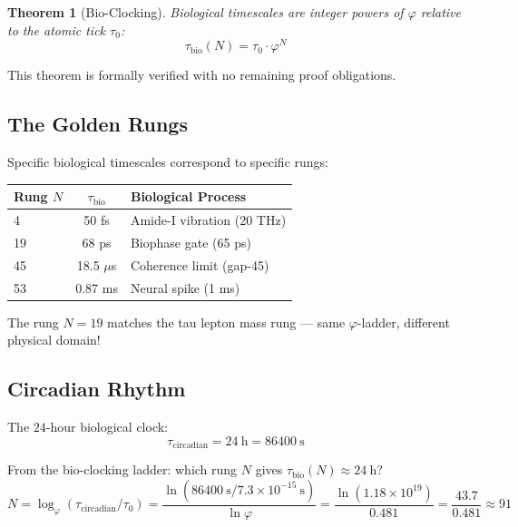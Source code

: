 \documentclass[12pt,a4paper]{article}
\newtheorem{theorem}{Theorem}[section]
\theoremstyle{definition}
\theoremstyle{remark}
\begin{document}
\begin{theorem}[Bio-Clocking]
\label{thm:bioclocking}
Biological timescales are integer powers of $\varphi$ 
relative to the atomic tick $\tau_0$:
\begin{equation}
\tau_\mathrm{bio}(N) = \tau_0 \cdot \varphi^N
\end{equation}
\end{theorem}

This theorem is formally verified with no remaining proof obligations.

\subsection{The Golden Rungs}

Specific biological timescales correspond to specific rungs:

\begin{center}
\begin{tabular}{lcl}
\hline
Rung $N$ & $\tau_\mathrm{bio}$ & Biological Process \\
\hline
4 & 50 fs & Amide-I vibration (20 THz) \\
19 & 68 ps & Biophase gate (65 ps) \\
45 & 18.5 $\mu$s & Coherence limit (gap-45) \\
53 & 0.87 ms & Neural spike (1 ms) \\
\hline
\end{tabular}
\end{center}

The rung $N = 19$ matches the tau lepton mass rung — same $\varphi$-ladder, different physical domain!

\subsection{Circadian Rhythm}

The $24$-hour biological clock:
\begin{equation}
\tau_\mathrm{circadian} = 24~\mathrm{h} = 86400~\mathrm{s}
\end{equation}

From the bio-clocking ladder: which rung $N$ gives $\tau_\mathrm{bio}(N) \approx 24~\mathrm{h}$?
\begin{equation}
N = \log_\varphi(\tau_\mathrm{circadian}/\tau_0) = \frac{\ln(86400~\mathrm{s} / 7.3 \times 10^{-15}~\mathrm{s})}{\ln\varphi}
= \frac{\ln(1.18 \times 10^{19})}{0.481} = \frac{43.7}{0.481} \approx 91
\end{equation}
\end{document}
